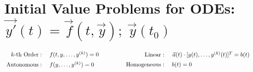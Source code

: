 \documentclass[12pt]{article}
\newcommand{\hs}{\hspace{1pt}}
\newcommand{\hsvec}[1]{\vec{\hs #1}}
\begin{document}
\newpage
\section{Initial Value Problems for ODEs: \(
    \hsvec{y'}{\scriptstyle(t)} = \hsvec{f}{\scriptstyle(t,\hsvec{y})}
    ;\ \hsvec{y}{\scriptstyle(t_0)}
\)}

\vspace{5pt}
\(\arraycolsep=2pt 
    \begin{array}{r c l}
        k \text{-th Order}: &\hspace{5pt}
            &f(t, y, \dots, y^{(k)}) = 0
            \\[5pt]
        \text{Autonomous}: &\hspace{5pt}
            &f(y, \dots, y^{(k)}) = 0
    \end{array}
    \hspace{1.5cm}
    \begin{array}{r c l}
        \text{Linear}: &\hspace{5pt}
            &\hsvec{a}(t) \cdot [y(t), \dots, y^{(k)}(t)]^T = b(t) 
            \\[5pt]
        \text{Homogeneous}: &\hspace{5pt}
            &b(t) = 0
    \end{array}
\)
\end{document}
